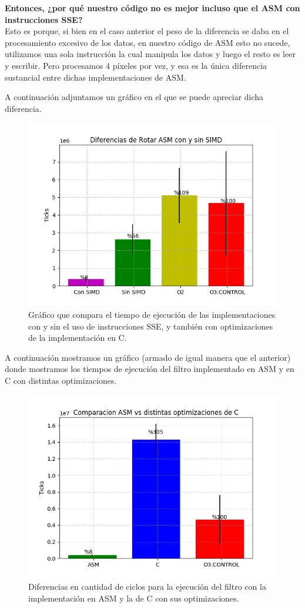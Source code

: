 {\textbf{Entonces, ¿por qué nuestro código no es mejor incluso que el ASM con instrucciones SSE?} \\
Esto es porque, si bien en el caso anterior el peso de la diferencia se daba en el procesamiento excesivo de los datos, en nuestro código de ASM esto no sucede, utilizamos una sola instrucción la cual manipula los datos y luego el resto es leer y escribir. Pero procesamos 4 píxeles por vez, y esa es la única diferencia sustancial entre dichas implementaciones de ASM.
}
\par{A continuación adjuntamos un gráfico en el que se puede apreciar dicha diferencia.}
	
\begin{figure}[H]
\centering
\captionsetup{justification=centering}
	\includegraphics[width = 15 cm, height = 10 cm]{imagenes/RotarSinSIMD.png}
\caption[center]{Gráfico que compara el tiempo de ejecución de las implementaciones con y sin el uso de instrucciones SSE, y también con optimizaciones de la implementación en C.}
\end{figure}

\par{A continuación mostramos un gráfico (armado de igual manera que el anterior) donde mostramos los tiempos de ejecución del filtro implementado en ASM y en C con distintas optimizaciones.}
	
\begin{figure}[H]
\centering
\captionsetup{justification=centering}
\includegraphics[width = 12 cm, height = 7 cm]{imagenes/ASMvsCRotar.png}
\caption[center]{Diferencias en cantidad de ciclos para la ejecución del filtro con la implementación en ASM y la de C con sus optimizaciones.}
\end{figure}